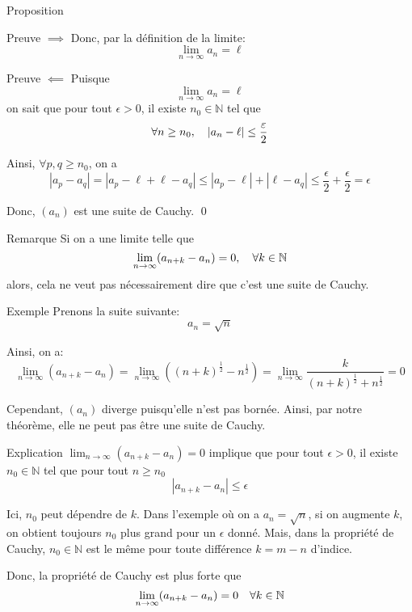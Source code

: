 \documentclass[a4paper]{article}
\begin{document}
\begin{parag}{Proposition}
\begin{subparag}{Preuve $\implies$}
        Donc, par la définition de la limite: 
        \[\lim_{n \to \infty} a_n = \ell\]
        
    \end{subparag}

    \begin{subparag}{Preuve $\impliedby$}
        Puisque 
        \[\lim_{n \to \infty} a_n = \ell\]
        on sait que pour tout $\epsilon > 0$, il existe $n_0 \in \mathbb{N}$ tel que 
        \[\forall n \geq n_0, \mathspace \left|a_n - \ell\right| \leq \frac{\epsilon}{2}\]
        
        Ainsi, $\forall p, q \geq n_0$, on a  
        \[\left|a_p - a_q\right| = \left|a_p - \ell + \ell - a_q\right| \leq \left|a_{p} - \ell\right| + \left|\ell - a_q\right| \leq \frac{\epsilon}{2} + \frac{\epsilon}{2} = \epsilon\]

        Donc, $\left(a_n\right)$ est une suite de Cauchy.
        \qed
    \end{subparag}
\end{parag}

\begin{parag}{Remarque}
    Si on a une limite telle que
    \[\lim_{n \to \infty} \left(a_{n+k} - a_n\right) = 0, \mathspace \forall k \in \mathbb{N}\]
    alors, cela ne veut pas nécessairement dire que c'est une suite de Cauchy.

    \begin{subparag}{Exemple}
        Prenons la suite suivante: 
        \[a_n = \sqrt{n}\]

        Ainsi, on a: 
        \[\lim_{n \to \infty} \left(a_{n+k} - a_n\right) = \lim_{n \to \infty} \left(\left(n + k\right)^{\frac{1}{2}} - n^{\frac{1}{2}}\right) = \lim_{n \to \infty} \frac{k}{\left(n + k\right)^{\frac{1}{2}} + n^{\frac{1}{2}}} = 0 \]
        
        Cependant, $\left(a_n\right)$ diverge puisqu'elle n'est pas bornée. Ainsi, par notre théorème, elle ne peut pas être une suite de Cauchy.
    \end{subparag}

    \begin{subparag}{Explication}
        $\lim_{n \to \infty} \left(a_{n+k} - a_n\right) = 0$ implique que pour tout $\epsilon > 0$, il existe $n_0 \in \mathbb{N}$ tel que pour tout $n \geq n_0$
        \[\left|a_{n+k} - a_n\right| \leq \epsilon\]
        
        Ici, $n_0$ peut dépendre de $k$. Dans l'exemple où on a $a_n = \sqrt{n}$, si on augmente $k$, on obtient toujours $n_0$ plus grand pour un $\epsilon$ donné. Mais, dans la propriété de Cauchy, $n_0 \in \mathbb{N}$ est le même pour toute différence $k = m - n$ d'indice.

        Donc, la propriété de Cauchy est plus forte que 
        \[\lim_{n \to \infty} \left(a_{n+k} - a_n\right) = 0 \mathspace \forall k \in \mathbb{N}\]
        
    \end{subparag}
     
\end{parag}
\end{document}
